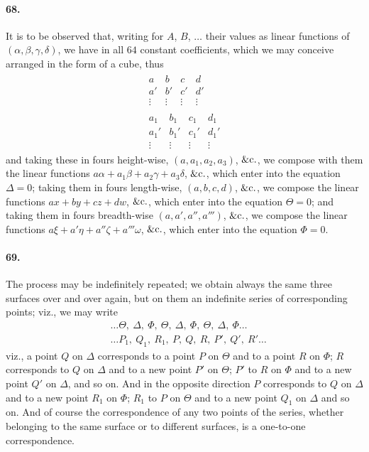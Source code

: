 \documentclass[11pt,a4paper]{article}
\begin{document}
\paragraph{68.}
It is to be observed that, writing for $A$, $B$, $\ldots$ their values as linear
functions of $(\alpha, \beta, \gamma, \delta)$, we have in all $64$ constant
coefficients, which we may conceive arranged in the form of a cube, thus
\[
\begin{array}{c}
\begin{array}{cccc}
a & b & c & d \\ a' & b' & c' & d' \\
\vdots & \vdots & \vdots & \vdots
\end{array}\\
\begin{array}{cccc}
a_1 & b_1 & c_1 & d_1 \\ a_1' & b_1' & c_1' & d_1' \\
\vdots & \vdots & \vdots & \vdots
\end{array}
\end{array}
\]
and taking these in fours height-wise, $(a, a_1, a_2, a_3)$, $\&{\rm c}.$, we
compose with them the linear functions $a\alpha + a_1\beta + a_2\gamma + a_3\delta$,
$\&{\rm c}.$, which enter into the equation $\Delta = 0$; taking them in fours
length-wise, $(a, b, c, d)$, $\&{\rm c}.$, we compose the linear functions
$ax + by + cz + dw$, $\&{\rm c}.$, which enter into the equation $\Theta = 0$; and
taking them in fours breadth-wise $(a, a', a'', a''')$, $\&{\rm c}.$, we compose
the linear functions $a\xi + a'\eta + a''\zeta + a'''\omega$, $\&{\rm c}.$, which
enter into the equation $\Phi = 0$.

\medskip

\paragraph{69.}
The process may be indefinitely repeated; we obtain always the same three surfaces
over and over again, but on them an indefinite series of corresponding points; viz.,
we may write
\begin{align*}
&\ldots \Theta,\ \Delta,\ \Phi,\ \Theta,\ \Delta,\ \Phi,\ \Theta,\ \Delta,\ \Phi \ldots\\
&\ldots P_1,\ Q_1,\ R_1,\ P,\ Q,\ R,\ P',\ Q',\ R' \ldots
\end{align*}
viz., a point $Q$ on $\Delta$ corresponds to a point $P$ on $\Theta$ and to a point
$R$ on $\Phi$; $R$ corresponds to $Q$ on $\Delta$ and to a new point $P'$ on $\Theta$;
$P'$ to $R$ on $\Phi$ and to a new point $Q'$ on $\Delta$, and so on. And in the
opposite direction $P$ corresponds to $Q$ on $\Delta$ and to a new point $R_1$ on
$\Phi$; $R_1$ to $P$ on $\Theta$ and to a new point $Q_1$ on $\Delta$ and so on. And
of course the correspondence of any two points of the series, whether belonging to
the same surface or to different surfaces, is a one-to-one correspondence.
\end{document}
